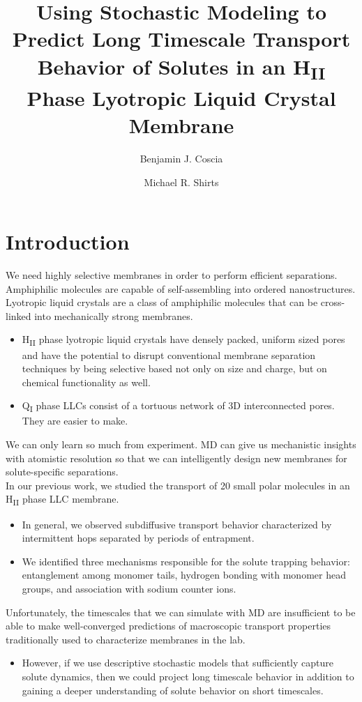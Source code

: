 \documentclass{article}
\title{Using Stochastic Modeling to Predict Long Timescale Transport Behavior of Solutes in an H\textsubscript{II} Phase Lyotropic Liquid Crystal Membrane}
\author{Benjamin J. Coscia \and Michael R. Shirts}
\begin{document}
  \graphicspath{{./figures/}}
  \maketitle

  \section{Introduction}
  We need highly selective membranes in order to perform efficient separations. \\

  \noindent Amphiphilic molecules are capable of self-assembling into ordered nanostructures.\\

  Lyotropic liquid crystals are a class of amphiphilic molecules that can be cross-linked
  into mechanically strong membranes.
  \begin{itemize}
  	\item H\textsubscript{II} phase lyotropic liquid crystals have densely packed, uniform
	sized pores and have the potential to disrupt conventional membrane separation
	techniques by being selective based not only on size and charge, but on chemical
	functionality as well.
	\item Q\textsubscript{I} phase LLCs consist of a tortuous network of 3D interconnected
	pores. They are easier to make.
  \end{itemize}

  We can only learn so much from experiment. MD can give us mechanistic insights with
  atomistic resolution so that we can intelligently design new membranes for 
  solute-specific separations.\\

  \noindent In our previous work, we studied the transport of 20 small polar molecules
  in an H\textsubscript{II} phase LLC membrane.
  \begin{itemize}
    \item In general, we observed subdiffusive transport behavior characterized by 
    intermittent hops separated by periods of entrapment.
    \item We identified three mechanisms responsible for the solute trapping behavior:
    entanglement among monomer tails, hydrogen bonding with monomer head groups, and
    association with sodium counter ions.
  \end{itemize}

  Unfortunately, the timescales that we can simulate with MD are insufficient to be
  able to make well-converged predictions of macroscopic transport properties 
  traditionally used to characterize membranes in the lab. \\
  \begin{itemize}
    \item However, if we use descriptive stochastic models that sufficiently capture solute
    dynamics, then we could project long timescale behavior in addition to gaining
    a deeper understanding of solute behavior on short timescales.
  \end{itemize}
  
\end{document}
